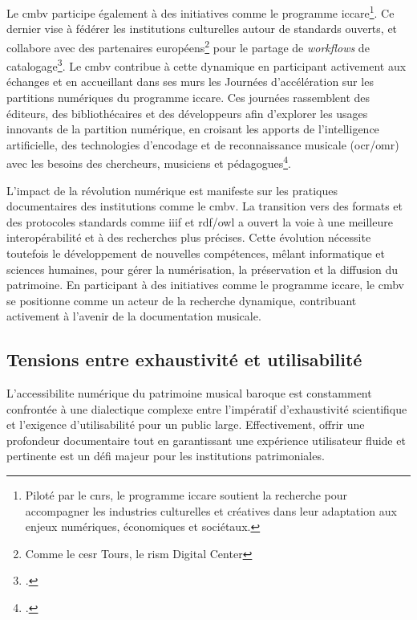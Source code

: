Le \gls{cmbv} participe également à des initiatives comme le programme \gls{iccare}\footnote{Piloté par le \gls{cnrs}, le programme \gls{iccare} soutient la recherche pour accompagner les industries culturelles et créatives dans leur adaptation aux enjeux numériques, économiques et sociétaux.}. Ce dernier vise à fédérer les institutions culturelles autour de standards ouverts, et collabore avec des partenaires européens\footnote{Comme le \gls{cesr} Tours, le \gls{rism} Digital Center} pour le partage de \textit{\glspl{workflow}} de catalogage\footcite{ICCAREPartitionNumerique}. Le \gls{cmbv} contribue à cette dynamique en participant activement aux échanges et en accueillant dans ses murs les Journées d'accélération sur les partitions numériques du programme \gls{iccare}. Ces journées rassemblent des éditeurs, des bibliothécaires et des développeurs afin d'explorer les usages innovants de la partition numérique, en croisant les apports de l’intelligence artificielle, des technologies d’encodage et de reconnaissance musicale (\gls{ocr}/\gls{omr}) avec les besoins des chercheurs, musiciens et pédagogues\footcite{braudJourneesAccelerationICCARELAB2025}.

L'impact de la révolution numérique est manifeste sur les pratiques documentaires des institutions comme le \gls{cmbv}. La transition vers des formats et des protocoles standards comme \gls{iiif} et \gls{rdf}/\gls{owl} a ouvert la voie à une meilleure interopérabilité et à des recherches plus précises. Cette évolution nécessite toutefois le développement de nouvelles compétences, mêlant informatique et sciences humaines, pour gérer la numérisation, la préservation et la diffusion du patrimoine. En participant à des initiatives comme le programme \gls{iccare}, le \gls{cmbv} se positionne comme un acteur de la recherche dynamique, contribuant activement à l'avenir de la documentation musicale.

\subsection{Tensions entre exhaustivité et utilisabilité}

L'\gls{accessibilite} numérique du patrimoine musical baroque est constamment confrontée à une dialectique complexe entre l'impératif d'exhaustivité scientifique et l'exigence d'utilisabilité pour un public large. Effectivement, offrir une profondeur documentaire tout en garantissant une expérience utilisateur fluide et pertinente est un défi majeur pour les institutions patrimoniales.

